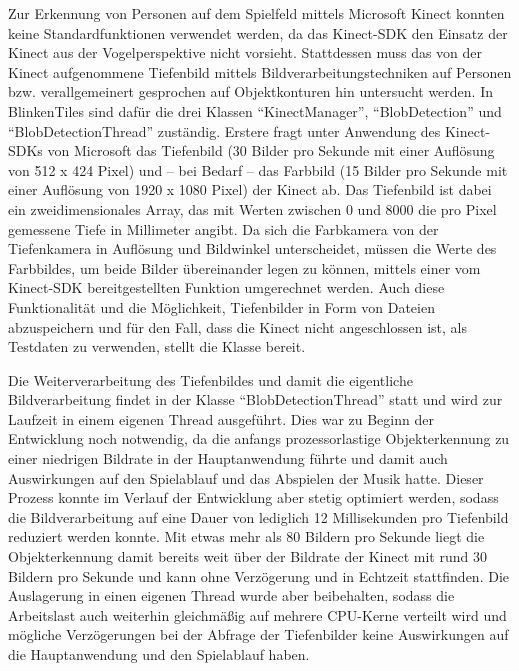 \label{sec:objdet}

Zur Erkennung von Personen auf dem Spielfeld mittels Microsoft Kinect konnten keine Standardfunktionen verwendet werden, da das Kinect-SDK den Einsatz der Kinect aus der Vogelperspektive nicht vorsieht. Stattdessen muss das von der Kinect aufgenommene Tiefenbild mittels Bildverarbeitungstechniken auf Personen bzw. verallgemeinert gesprochen auf Objektkonturen hin untersucht werden. In BlinkenTiles sind dafür die drei Klassen \enquote{KinectManager}, \enquote{BlobDetection} und \enquote{BlobDetectionThread} zuständig. Erstere fragt unter Anwendung des Kinect-SDKs von Microsoft das Tiefenbild (30 Bilder pro Sekunde mit einer Auflösung von 512 x 424 Pixel) und -- bei Bedarf -- das Farbbild (15 Bilder pro Sekunde mit einer Auflösung von 1920 x 1080 Pixel) der Kinect ab. Das Tiefenbild ist dabei ein zweidimensionales Array, das mit Werten zwischen 0 und 8000 die pro Pixel gemessene Tiefe in Millimeter angibt. Da sich die Farbkamera von der Tiefenkamera in Auflösung und Bildwinkel unterscheidet, müssen die Werte des Farbbildes, um beide Bilder übereinander legen zu können, mittels einer vom Kinect-SDK bereitgestellten Funktion umgerechnet werden. Auch diese Funktionalität und die Möglichkeit, Tiefenbilder in Form von Dateien abzuspeichern und für den Fall, dass die Kinect nicht angeschlossen ist, als Testdaten zu verwenden, stellt die Klasse bereit.

Die Weiterverarbeitung des Tiefenbildes und damit die eigentliche Bildverarbeitung findet in der Klasse \enquote{BlobDetectionThread} statt und wird zur Laufzeit in einem eigenen Thread ausgeführt. Dies war zu Beginn der Entwicklung noch notwendig, da die anfangs prozessorlastige Objekterkennung zu einer niedrigen Bildrate in der Hauptanwendung führte und damit auch Auswirkungen auf den Spielablauf und das Abspielen der Musik hatte. Dieser Prozess konnte im Verlauf der Entwicklung aber stetig optimiert werden, sodass die Bildverarbeitung auf eine Dauer von lediglich 12 Millisekunden pro Tiefenbild reduziert werden konnte. Mit etwas mehr als 80 Bildern pro Sekunde liegt die Objekterkennung damit bereits weit über der Bildrate der Kinect mit rund 30 Bildern pro Sekunde und kann ohne Verzögerung und in Echtzeit stattfinden. Die Auslagerung in einen eigenen Thread wurde aber beibehalten, sodass die Arbeitslast auch weiterhin gleichmäßig auf mehrere CPU-Kerne verteilt wird und mögliche Verzögerungen bei der Abfrage der Tiefenbilder keine Auswirkungen auf die Hauptanwendung und den Spielablauf haben.

